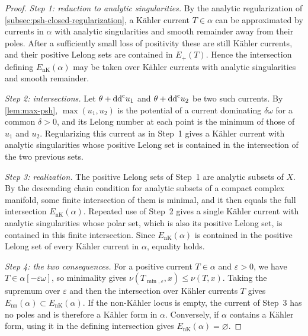 \begin{proof}
\emph{Step 1: reduction to analytic singularities.} By the analytic regularization of \cref{subsec:psh-closed-regularization}, a K\"ahler current $T\in\alpha$ can be approximated by currents in $\alpha$ with analytic singularities and smooth remainder away from their poles. After a sufficiently small loss of positivity these are still K\"ahler currents, and their positive Lelong sets are contained in $E_+(T)$. Hence the intersection defining $E_{\mathrm{nK}}(\alpha)$ may be taken over K\"ahler currents with analytic singularities and smooth remainder.

\emph{Step 2: intersections.} Let $\theta+\mathrm{dd}^{\mathrm{c}} u_1$ and $\theta+\mathrm{dd}^{\mathrm{c}} u_2$ be two such currents. By \cref{lem:max-psh}, $\max(u_1,u_2)$ is the potential of a current dominating $\delta\omega$ for a common $\delta>0$, and its Lelong number at each point is the minimum of those of $u_1$ and $u_2$. Regularizing this current as in Step~1 gives a K\"ahler current with analytic singularities whose positive Lelong set is contained in the intersection of the two previous sets.

\emph{Step 3: realization.} The positive Lelong sets of Step~1 are analytic subsets of $X$. By the descending chain condition for analytic subsets of a compact complex manifold, some finite intersection of them is minimal, and it then equals the full intersection $E_{\mathrm{nK}}(\alpha)$. Repeated use of Step~2 gives a single K\"ahler current with analytic singularities whose polar set, which is also its positive Lelong set, is contained in this finite intersection. Since $E_{\mathrm{nK}}(\alpha)$ is contained in the positive Lelong set of every K\"ahler current in $\alpha$, equality holds.

\emph{Step 4: the two consequences.} For a positive current $T\in\alpha$ and $\varepsilon>0$, we have $T\in\alpha[-\varepsilon\omega]$, so minimality gives $\nu(T_{\min,\varepsilon},x)\leq\nu(T,x)$. Taking the supremum over $\varepsilon$ and then the intersection over K\"ahler currents $T$ gives $E_{\mathrm{nn}}(\alpha)\subset E_{\mathrm{nK}}(\alpha)$. If the non-K\"ahler locus is empty, the current of Step~3 has no poles and is therefore a K\"ahler form in $\alpha$. Conversely, if $\alpha$ contains a K\"ahler form, using it in the defining intersection gives $E_{\mathrm{nK}}(\alpha)=\varnothing$.
\end{proof}

